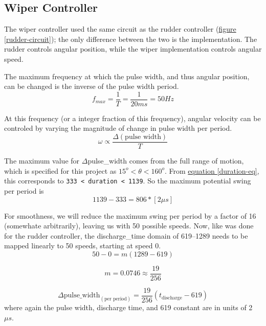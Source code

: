 \documentclass[11pt]{article}
\begin{document}
\subsection{Wiper Controller}

The wiper controller used the same circuit as the rudder controller
(\hyperref[rudder-circuit]{figure \ref{rudder-circuit}}); the only
difference between the two is the implementation. The rudder controls
angular position, while the wiper implementation controls angular speed.

The maximum frequency at which the pulse width, and thus angular position,
can be changed is the inverse of the pulse width period.
\begin{equation*}
f_{max}=\frac{1}{T}=\frac{1}{20ms}=50 Hz
\end{equation*}

At this frequency (or a integer fraction of this frequency),
angular velocity can be controled by varying the magnitude
of change in pulse width per period.
\begin{equation}
\omega\propto\frac{\Delta(\textrm{pulse width})}{T}
\end{equation}

The maximum value for $\Delta$pulse\_width comes from the full range
of motion, which is specified for this project as $15^{o}<\theta<160^{o}$.
From \hyperref[duration-eq]{equation \ref{duration-eq}},
this corresponds to \mbox{\texttt{333 < duration < 1139}}.
So the maximum potential swing per period is
\begin{equation*}
1139-333=806*[2\mu s]
\end{equation*}

For smoothness, we will reduce the maximum swing per period
by a factor of 16 (somewhate arbitrarily), leaving us with 50 possible speeds.
Now, like was done for the rudder controller, the discharge\_time domain of 619--1289
needs to be mapped linearly to 50 speeds, starting at speed 0.
\begin{equation*}
50-0=m(1289-619)
\end{equation*}

\begin{equation*}
m=0.0746\approx\frac{19}{256}
\end{equation*}

\begin{equation}
\Delta\textrm{pulse\_width}_{(\textrm{per period})}=\frac{19}{256}(t_{\textrm{discharge}}-619)
\end{equation}
where again the pulse width, discharge time, and 619 constant are in units of 2 $\mu s$.
\end{document}
